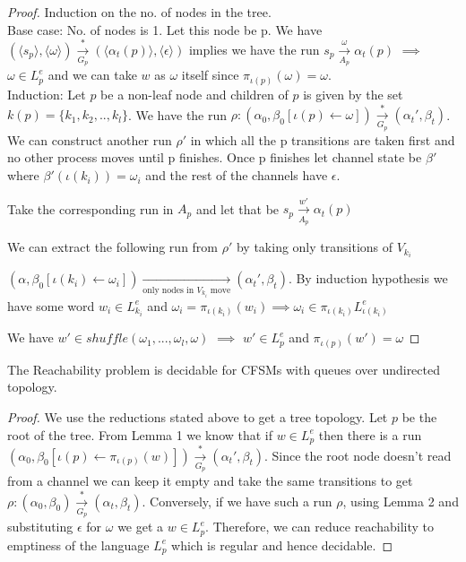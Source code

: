 \documentclass[a4paper,UKenglish,cleveref, autoref, thm-restate]{lipics-v2019}
\begin{document}
\begin{proof}
Induction on the no. of nodes in the tree. \\
\hspace*{0.5cm}Base case: No. of nodes is 1. Let this node be p. We have $(\langle s_p \rangle, \langle \omega \rangle ) \xrightarrow[G_p]{*} (\langle \alpha_t(p) \rangle, \langle \epsilon \rangle)$ implies we have the run $s_p \xrightarrow[A_p]{\omega } \alpha_t(p)$ $\implies$ $\omega \in L_p^e$ and we can take $w$ as $\omega$ itself since $\pi_{\iota(p)}(\omega) = \omega$. \\
\hspace*{0.5cm}Induction: Let $p$ be a non-leaf node and children of $p$ is given by the set $k(p) = \{k_1, k_2, .., k_l\}$. We have the run $\rho: (\alpha_0, \beta_0[\iota(p) \leftarrow \omega]) \xrightarrow[G_p]{*} (\alpha_t', \beta_t)$. 
We can construct another run $\rho'$ in which all the p transitions are taken first and no other process moves until p finishes. Once p finishes let channel state be $\beta'$ 
where $\beta'(\iota(k_i)) = \omega_i$ and the rest of the channels have $\epsilon$. 

Take the corresponding run in $A_p$ and let that be $s_p \xrightarrow[A_p]{w'} \alpha_t(p)$

We can extract the following run from $\rho'$ by taking only transitions of $V_{k_i}$ 

$(\alpha, \beta_0[\iota(k_i) \leftarrow \omega_i]) \xrightarrow[\text{only nodes in $V_{k_i}$ move}]{} (\alpha_t', \beta_t)$. By induction hypothesis we have some word $w_i \in L_{k_i}^e$ and $\omega_i = \pi_{\iota(k_i)}(w_i) \implies \omega_i \in \pi_{\iota(k_i)}L_{\iota(k_i)}^e$

We have $w' \in shuffle(\omega_1, ..., \omega_l, \omega)$ 
$\implies$ $w' \in L_p^e$ and $\pi_{\iota(p)}(w') = \omega$


\end{proof}
    

   
\begin{theorem}\label{testenv-theorem}
    The Reachability problem is decidable for CFSMs with queues over undirected topology. 
   \end{theorem}

   
\begin{proof}
    We use the reductions stated above to get a tree topology. Let $p$ be the root of the tree. From Lemma 1 we know that if $w \in L_p^e$ then there is a run  $(\alpha_0, \beta_0[\iota(p) \leftarrow \pi_{\iota(p)}(w) ]) \xrightarrow[G_p]{*} (\alpha_t', \beta_t)$. Since the root node doesn't read from a channel we can keep it empty and take the same transitions to get $\rho: (\alpha_0, \beta_0) \xrightarrow[G_p]{*} (\alpha_t, \beta_t)$. Conversely, if we have such a run $\rho$, using Lemma 2 and substituting $\epsilon$ for $\omega$ we get a $w \in L_p^e$. Therefore, we can reduce reachability to emptiness of the language $L_p^e$ which is regular and hence decidable. 

    
   \end{proof}
\end{document}
